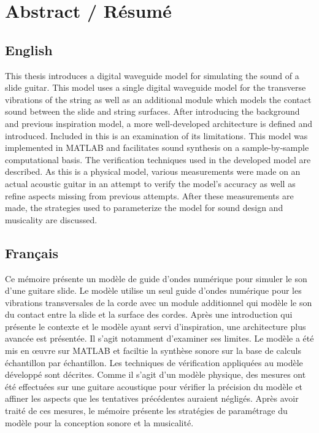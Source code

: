 \documentclass[../main.tex]{subfiles}
\begin{document}
\chapter*{Abstract / Résumé}
\section*{English}
This thesis introduces a digital waveguide model for simulating the sound of a slide guitar. This model uses a single digital waveguide model for the transverse vibrations of the string as well as an additional module which models the contact sound between the slide and string surfaces. After introducing the background and previous inspiration model, a more well-developed architecture is defined and introduced. Included in this is an examination of its limitations. This model was implemented in MATLAB and facilitates sound synthesis on a sample-by-sample computational basis. The verification techniques used in the developed model are described. As this is a physical model, various measurements were made on an actual acoustic guitar in an attempt to verify the model's accuracy as well as refine aspects missing from previous attempts. After these measurements are made, the strategies used to parameterize the model for sound design and musicality are discussed.

\section*{Français}
Ce mémoire présente un modèle de guide d’ondes numérique pour simuler le son d’une guitare slide. Le modèle utilise un seul guide d’ondes numérique pour les vibrations transversales de la corde avec un module additionnel qui modèle le son du contact entre la slide et la surface des cordes. Après une introduction qui présente le contexte et le modèle ayant servi d’inspiration, une architecture plus avancée est présentée. Il s'agit notamment d’examiner ses limites. Le modèle a été mis en œuvre sur MATLAB et faciltie la synthèse sonore sur la base de calculs échantillon par échantillon. Les techniques de vérification appliquées au modèle développé sont décrites. Comme il  s’agit d’un modèle physique, des mesures ont été effectuées sur une guitare acoustique pour vérifier la précision du modèle et affiner les aspects que les tentatives précédentes auraient négligés. Après avoir traité de ces mesures, le mémoire présente les stratégies de paramétrage du modèle pour la conception sonore et la musicalité.
\end{document}
